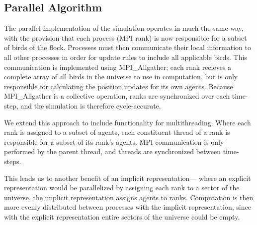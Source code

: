 \subsection*{Parallel Algorithm}
The parallel implementation of the simulation operates in much the
same way, with the provision that each process (MPI rank) is now
responsible for a subset of birds of the flock. Processes must then
communicate their local information to all other processes in order
for update rules to include all applicable birds. This communication
is implemented using MPI\_Allgather; each rank recieves a complete
array of all birds in the universe to use in computation, but is only
responsible for calculating the position updates for its own agents.
Because MPI\_Allgather is a collective operation, ranks are
synchronized over each time-step, and the simulation is therefore
cycle-accurate.

We extend this approach to include functionality for
multithreading. Where each rank is assigned to a subset of agents,
each constituent thread of a rank is responsible for a subset of
its rank's agents. MPI communication is only performed by the parent
thread, and threads are synchronized between time-steps.

This leads us to another benefit of an implicit representation---
where an explicit representation would be parallelized by assigning
each rank to a sector of the universe, the implicit representation
assigns agents to ranks. Computation is then more evenly distributed
between processes with the implicit representation, since with the
explicit representation entire sectors of the universe could be empty.
